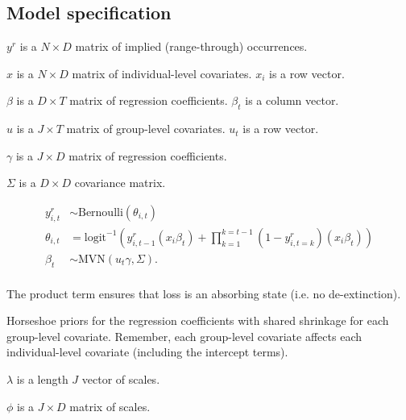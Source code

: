 \documentclass[12pt,letterpaper]{article}
\begin{document}



\subsection*{Model specification}


\(y^{r}\) is a \(N \times D\) matrix of implied (range-through) occurrences.

\(x\) is a \(N \times D\) matrix of individual-level covariates. \(x_{i}\) is a row vector.

\(\beta\) is a \(D \times T\) matrix of regression coefficients. \(\beta_{t}\) is a column vector.

\(u\) is a \(J \times T\) matrix of group-level covariates. \(u_{t}\) is a row vector.

\(\gamma\) is a \(J \times D\) matrix of regression coefficients.

\(\Sigma\) is a \(D \times D\) covariance matrix.

\begin{equation}
  \begin{aligned}
    y^{r}_{i,t} &\sim \text{Bernoulli}(\theta_{i,t}) \\
    \theta_{i, t} &= \text{logit}^{-1}(y^{r}_{i, t - 1} (x_{i} \beta_{t}) + \prod_{k = 1}^{k = t - 1}(1 - y^{r}_{i, t = k}) (x_{i} \beta_{t})) \\
    \beta_{t} &\sim \text{MVN}(u_{t} \gamma, \Sigma). \\
  \end{aligned}
  \label{eq:core}
\end{equation}

The product term ensures that loss is an absorbing state (i.e. no de-extinction).


Horseshoe priors for the regression coefficients with shared shrinkage for each group-level covariate. Remember, each group-level covariate affects each individual-level covariate (including the intercept terms).

\(\lambda\) is a length \(J\) vector of scales.

\(\phi\) is a \(J \times D\) matrix of scales.
\end{document}

